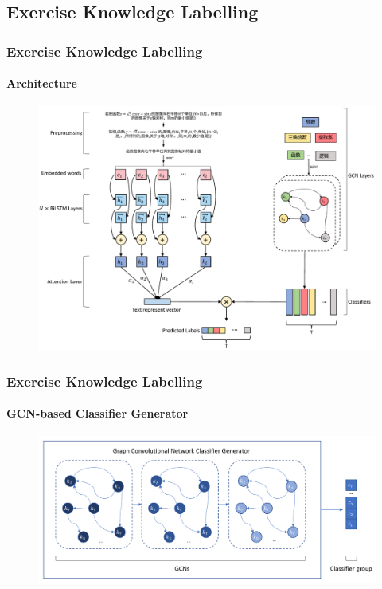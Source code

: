 \documentclass[10pt,aspectratio=43,mathserif]{beamer}
\begin{document}
\subsection{Exercise Knowledge Labelling}
\begin{frame}
	\frametitle{Exercise Knowledge Labelling}
	\framesubtitle{Architecture}
	\begin{figure}
		\centering
		\includegraphics[height=0.80\textheight]{figures/ch2-ov.pdf}
	\end{figure}
\end{frame}

\begin{frame}
	\frametitle{Exercise Knowledge Labelling}
	\framesubtitle{GCN-based Classifier Generator}
	\begin{figure}
		\centering
		\includegraphics[width=1.0\textwidth]{figures/ch2-gcnclsgen-model.pdf}
	\end{figure}
\end{frame}
\end{document}
